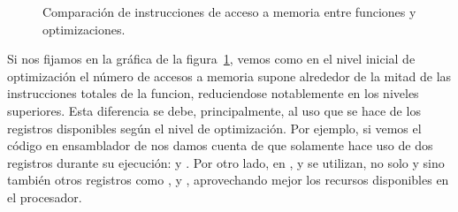 \begin{figure}[ht]
\begin{center}
\end{center}
\caption{Comparación de instrucciones de acceso a memoria entre funciones y optimizaciones.}
\label{graph:memoria}
\end{figure}

Si nos fijamos en la gráfica de la figura~\ref{graph:memoria}, vemos como en el nivel inicial de optimización el número de accesos a memoria supone alrededor de la mitad de las instrucciones totales de la funcion, reduciendose notablemente en los niveles superiores. Esta diferencia se debe, principalmente, al uso que se hace de los registros disponibles según el nivel de optimización. Por ejemplo, si vemos el código en ensamblador de  nos damos cuenta de que solamente hace uso de dos registros durante su ejecución:  y . Por otro lado, en ,  y  se utilizan, no solo  y  sino también otros registros como ,  y , aprovechando mejor los recursos disponibles en el procesador.

